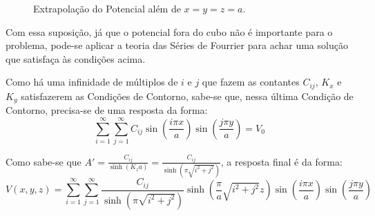 \documentclass{report}
\begin{document}
\begin{figure}[h!]
    \centering
    \caption{\label{plot:potencial_ext} Extrapolação do Potencial além de $ x = y = z = a $.}
\end{figure}

Com essa suposição, já que o potencial fora do cubo não é importante para o problema, pode-se
aplicar a teoria das Séries de Fourrier para achar uma solução que satisfaça às condições acima.

Como há uma infinidade de múltiplos de $ i $ e $ j $ que fazem as contantes $ C_{ij} $, $ K_x $ e $ K_y $ satisfazerem as
Condições de Contorno, sabe-se que, nessa última Condição de Contorno, precisa-se de uma resposta da forma:
$$ \sum_{i=1}^{\infty} \sum_{j=1}^{\infty} C_{ij}\sin\left(\frac{i\pi x}{a}\right)\sin\left(\frac{j\pi y}{a}\right) = V_0 $$

Como sabe-se que $ A' = \frac{C_{ij}}{\sinh(K_za)} = \frac{C_{ij}}{\sinh(\pi\sqrt{i^2 + j^2})} $, a resposta final é da forma:
$$ V(x, y, z) = \sum_{i=1}^{\infty} \sum_{j=1}^{\infty} \frac{C_{ij}}{\sinh(\pi\sqrt{i^2 + j^2})}\sinh\left(\frac{\pi}{a}\sqrt{i^2 + j^2}z\right)\sin\left(\frac{i\pi x}{a}\right)\sin\left(\frac{j\pi y}{a}\right) $$
\end{document}
